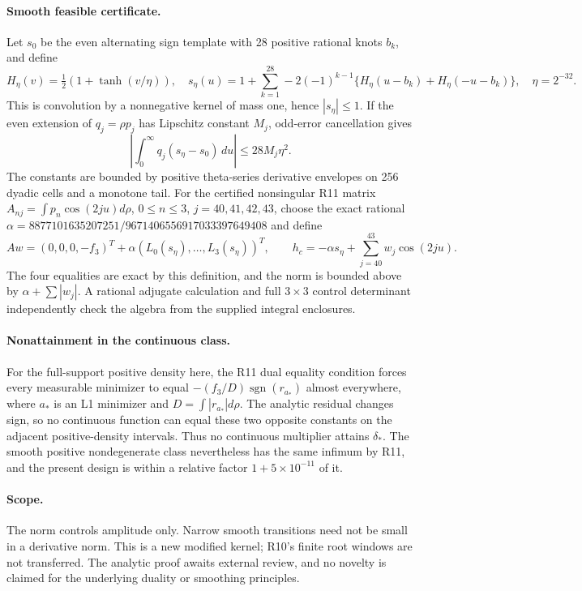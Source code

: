 \paragraph{Smooth feasible certificate.}
Let $s_0$ be the even alternating sign template with 28 positive
rational knots $b_k$, and define
\[
 H_\eta(v)=\tfrac12(1+\tanh(v/\eta)),\quad
 s_\eta(u)=1+\sum_{k=1}^{28}-2(-1)^{k-1}
        \{H_\eta(u-b_k)+H_\eta(-u-b_k)\},\quad \eta=2^{-32}.
\]
This is convolution by a nonnegative kernel of mass one, hence
$|s_\eta|\le1$. If the even extension of $q_j=\rho p_j$ has
Lipschitz constant $M_j$, odd-error cancellation gives
\[
 \left|\int_0^\infty q_j(s_\eta-s_0)\,du\right|
       \le28M_j\eta^2.
\]
The constants are bounded by positive theta-series derivative
envelopes on 256 dyadic cells and a monotone tail.
For the certified nonsingular R11 matrix
$A_{nj}=\int p_n\cos(2ju)d\rho$, $0\le n\le3$, $j=40,41,42,43$,
choose the exact rational
$\alpha=8877101635207251/9671406556917033397649408$ and define
\[
 Aw=(0,0,0,-f_3)^T+\alpha(L_0(s_\eta),\ldots,L_3(s_\eta))^T,
 \qquad h_c=-\alpha s_\eta+\sum_{j=40}^{43}w_j\cos(2ju).
\]
The four equalities are exact by this definition, and the norm is
bounded above by $\alpha+\sum|w_j|$. A rational adjugate calculation
and full $3\times3$ control determinant independently check the
algebra from the supplied integral enclosures.

\paragraph{Nonattainment in the continuous class.}
For the full-support positive density here, the R11 dual equality
condition forces every measurable minimizer to equal
$-(f_3/D)\operatorname{sgn}(r_{a_*})$ almost everywhere, where
$a_*$ is an L1 minimizer and $D=\int|r_{a_*}|d\rho$.
The analytic residual changes sign, so no continuous function can
equal these two opposite constants on the adjacent positive-density
intervals. Thus no continuous multiplier attains $\delta_*$.
The smooth positive nondegenerate class nevertheless has the same
infimum by R11, and the present design is within a relative factor
$1+5\times10^{-11}$ of it.

\paragraph{Scope.}
The norm controls amplitude only. Narrow smooth transitions need
not be small in a derivative norm. This is a new modified kernel;
R10's finite root windows are not transferred. The analytic proof
awaits external review, and no novelty is claimed for the underlying
duality or smoothing principles.
